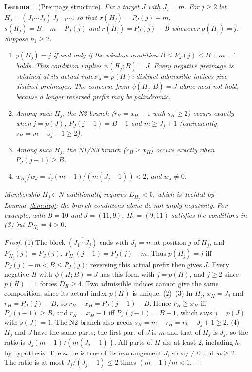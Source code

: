 \documentclass[11pt]{article}
\newtheorem{lemma}{Lemma}
\theoremstyle{remark}
\theoremstyle{definition}
\newcommand{\rev}{\overline}
\begin{document}
\begin{lemma}[Preimage structure]\label{lem:pre}
Fix a target $J$ with $J_1=m$. For $j\ge2$ let $H_j=\rev{(J_1\cdots J_j)}\,J_{j+1}\cdots$, so that $\sigma(H_j)=P_J(j)-m$, $s(H_j)=B+m-P_J(j)$ and $r(H_j)=P_J(j)-B$ whenever $p(H_j)=j$. Suppose $h_1\ge2$.
\begin{enumerate}
\item $p(H_j)=j$ if and only if the window condition $B\le P_J(j)\le B+m-1$ holds. This condition implies $\psi(H_j;B)=J$. Every negative preimage is obtained at its actual index $j=p(H)$; distinct admissible indices give distinct preimages. The converse from $\psi(H_j;B)=J$ alone need not hold, because a longer reversed prefix may be palindromic.
\item Among such $H_j$, the N2 branch ($r_H=x_H-1$ with $s_H\ge2$) occurs exactly when $j=p(J)$, $P_J(j-1)=B-1$ and $m\ge J_j+1$ (equivalently $s_H=m-J_j+1\ge2$).
\item Among such $H_j$, the N1/N3 branch ($r_H\ge x_H$) occurs exactly when $P_J(j-1)\ge B$.
\item $w_{H_j}/w_J=J_j(m-1)/(m(J_j-1))<2$, and $w_J\ne0$.
\end{enumerate}
Membership $H_j\in N$ additionally requires $D_{H_j}<0$, which is decided by Lemma~\ref{lem:neg}; the branch conditions alone do not imply negativity. For example, with $B=10$ and $J=(11,9)$, $H_2=(9,11)$ satisfies the conditions in (3) but $D_{H_2}=4>0$.
\end{lemma}
\begin{proof}
(1) The block $\rev{(J_1\cdots J_j)}$ ends with $J_1=m$ at position $j$ of $H_j$, and $P_{H_j}(j)=P_J(j)$, $P_{H_j}(j-1)=P_J(j)-m$. Thus $p(H_j)=j$ iff $P_J(j)-m<B\le P_J(j)$; reversing this actual prefix then gives $J$. Every negative $H$ with $\psi(H;B)=J$ has this form with $j=p(H)$, and $j\ge2$ since $p(H)=1$ forces $D_H\ge4$. Two admissible indices cannot give the same composition, since its actual index $p(H)$ is unique.
(2)--(3) In $H_j$, $x_H=J_j$ and $r_H=P_J(j)-B$, so $r_H-x_H=P_J(j-1)-B$. Hence $r_H\ge x_H$ iff $P_J(j-1)\ge B$, and $r_H=x_H-1$ iff $P_J(j-1)=B-1$, which says $j=p(J)$ with $s(J)=1$. The N2 branch also needs $s_H=m-r_H=m-J_j+1\ge2$.
(4) $H_j$ and $J$ have the same parts; the first part of $J$ is $m$ and that of $H_j$ is $J_j$, so the ratio is $J_j(m-1)/(m(J_j-1))$. All parts of $H$ are at least $2$, including $h_1$ by hypothesis. The same is true of its rearrangement $J$, so $w_J\ne0$ and $m\ge2$. The ratio is at most $J_j/(J_j-1)\le 2$ times $(m-1)/m<1$.
\end{proof}
\end{document}

